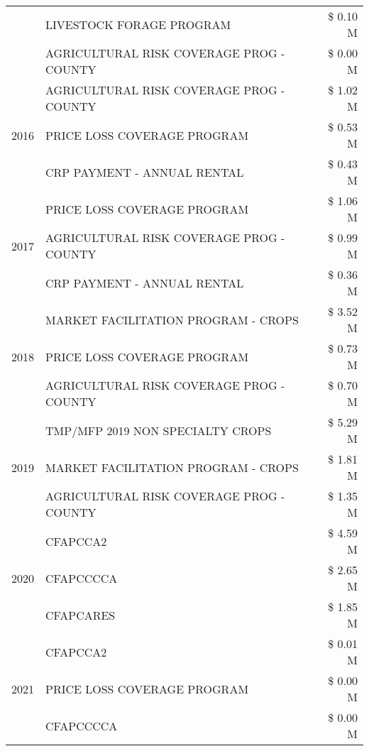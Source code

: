 \begin{tabular}{llr}
 & LIVESTOCK FORAGE PROGRAM & \$ 0.10 M \\
 & AGRICULTURAL RISK COVERAGE PROG - COUNTY & \$ 0.00 M \\
\cline{1-3}
\multirow[t]{3}{*}{2016} & AGRICULTURAL RISK COVERAGE PROG - COUNTY & \$ 1.02 M \\
 & PRICE LOSS COVERAGE PROGRAM & \$ 0.53 M \\
 & CRP PAYMENT - ANNUAL RENTAL & \$ 0.43 M \\
\cline{1-3}
\multirow[t]{3}{*}{2017} & PRICE LOSS COVERAGE PROGRAM & \$ 1.06 M \\
 & AGRICULTURAL RISK COVERAGE PROG - COUNTY & \$ 0.99 M \\
 & CRP PAYMENT - ANNUAL RENTAL & \$ 0.36 M \\
\cline{1-3}
\multirow[t]{3}{*}{2018} & MARKET FACILITATION PROGRAM - CROPS & \$ 3.52 M \\
 & PRICE LOSS COVERAGE PROGRAM & \$ 0.73 M \\
 & AGRICULTURAL RISK COVERAGE PROG - COUNTY & \$ 0.70 M \\
\cline{1-3}
\multirow[t]{3}{*}{2019} & TMP/MFP 2019 NON SPECIALTY CROPS & \$ 5.29 M \\
 & MARKET FACILITATION PROGRAM - CROPS & \$ 1.81 M \\
 & AGRICULTURAL RISK COVERAGE PROG - COUNTY & \$ 1.35 M \\
\cline{1-3}
\multirow[t]{3}{*}{2020} & CFAPCCA2 & \$ 4.59 M \\
 & CFAPCCCCA & \$ 2.65 M \\
 & CFAPCARES & \$ 1.85 M \\
\cline{1-3}
\multirow[t]{3}{*}{2021} & CFAPCCA2 & \$ 0.01 M \\
 & PRICE LOSS COVERAGE PROGRAM & \$ 0.00 M \\
 & CFAPCCCCA & \$ 0.00 M \\
\cline{1-3}
\bottomrule
\end{tabular}
